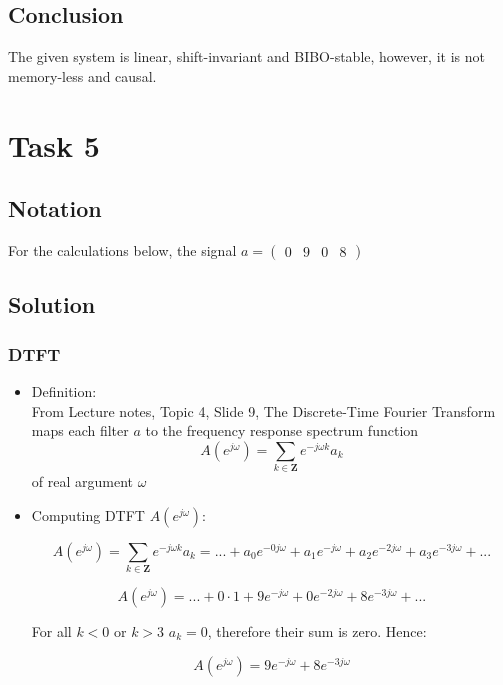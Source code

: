 \documentclass[12pt,a4paper]{article}
\begin{document}
    \subsection{Conclusion}
    The given system is linear, shift-invariant and BIBO-stable, however, it is not memory-less and causal.

    
 \section{Task 5}
 
 \subsection{Notation}
For the calculations below, the signal $a = \begin{pmatrix} 0 & 9 & 0 & 8 \end{pmatrix}$ 

 \subsection{Solution}
\subsubsection{DTFT}
 \begin{itemize}  
 \item Definition:\\
    From Lecture notes, Topic 4, Slide 9, The Discrete-Time Fourier Transform maps each filter $a$ to the frequency response spectrum function
    $$A(e^{j\omega }) = \sum_{k \in \boldsymbol{Z}} e^{-j\omega k} a_k$$
    of real argument $\omega$
     \item Computing DTFT $A(e^{j\omega}):$
  
        $$ A(e^{j\omega}) = \sum_{k \in \boldsymbol{Z}} e^{-j\omega k} a_k = ... + a_0e^{-0j\omega} + a_1e^{-j\omega} + a_2e^{-2j\omega} + a_3e^{-3j\omega} + ... $$
        
        $$ A(e^{j\omega}) = ... + 0\cdot 1 + 9e^{-j\omega} + 0e^{-2j\omega} + 8e^{-3j\omega} + ... $$
        
        For all $k<0$ or $k>3$ $a_k = 0$, therefore their sum is zero. Hence:
        
        $$ A(e^{j\omega}) = 9e^{-j\omega} + 8e^{-3j\omega}  $$
\end{itemize}
\end{document}
